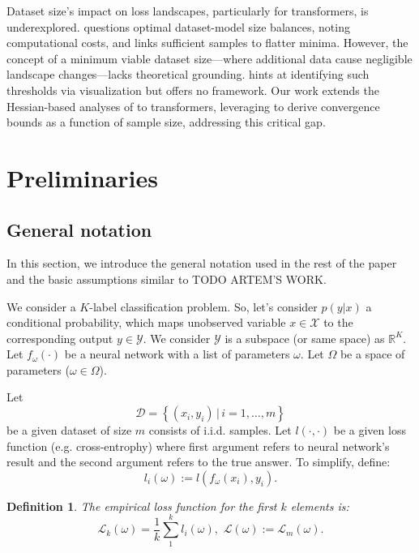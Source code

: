 \documentclass{article}
\newtheorem{definition}{Definition}
\begin{document}
Dataset size’s impact on loss landscapes, particularly for transformers, is underexplored. \cite{hoffmann2022training} questions optimal dataset-model size balances, noting computational costs, and \cite{wu2017towards} links sufficient samples to flatter minima. However, the concept of a minimum viable dataset size—where additional data cause negligible landscape changes—lacks theoretical grounding. \cite{xie2024losslens} hints at identifying such thresholds via visualization but offers no framework. Our work extends the Hessian-based analyses of \cite{kiselev2024unraveling, meshkov2024convnets} to transformers, leveraging \cite{ormaniec2024attentionhessian} to derive convergence bounds as a function of sample size, addressing this critical gap.

\section{Preliminaries}\label{sec:prelim}

\subsection{General notation}

In this section, we introduce the general notation used in the rest of the paper and the basic assumptions similar to \cite{} TODO ARTEM'S WORK.

We consider a $K$-label classification problem.
So, let's consider $p(y|x)$ a conditional probability, which maps unobserved variable $x \in \mathcal{X}$ to the corresponding
output $y \in \mathcal{Y}$. We consider $\mathcal{Y}$ is a subspace (or same space) as $\mathbb{R}^K$. Let $f_{\omega}(\cdot)$
be a neural network with a list of parameters $\omega$. Let $\Omega$ be a space of parameters ($\omega \in \Omega$).

Let
$$\mathcal{D} = \left\{ (x_i, y_i) \, | \, i = 1, \dots, m \right\}$$
be a given dataset of size $m$ consists of i.i.d.
samples. Let $l(\cdot, \cdot)$ be a given loss function (e.g. cross-entrophy) where first argument refers to neural network's
result and the second argument refers to the true answer. To simplify, define: $$l_i(\omega) := l(f_{\omega}(x_i), y_i).$$

\begin{definition}
  The empirical loss function for the first $k$ elements is:
  $$\mathcal{L}_k(\omega) = \frac1k \sum\limits_1^k l_i(\omega), \,\, \mathcal{L}(\omega) := \mathcal{L}_m(\omega).$$
\end{definition}
\end{document}
